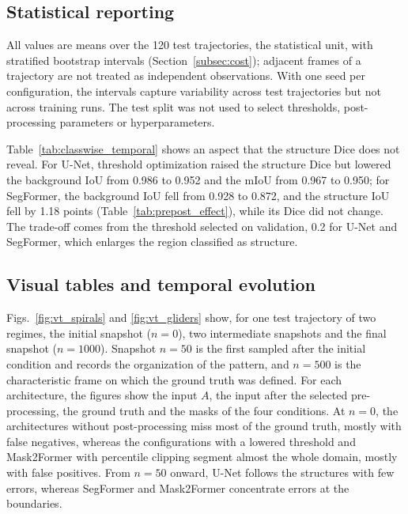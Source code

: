 \documentclass[final,5p,times,twocolumn]{elsarticle}
\begin{document}


\subsection{Statistical reporting}\label{subsec:statistics}

All values are means over the 120 test trajectories, the statistical unit, with stratified bootstrap intervals (Section~\ref{subsec:cost}); adjacent frames of a trajectory are not treated as independent observations. With one seed per configuration, the intervals capture variability across test trajectories but not across training runs. The test split was not used to select thresholds, post-processing parameters or hyperparameters.

Table~\ref{tab:classwise_temporal} shows an aspect that the structure Dice does not reveal. For U-Net, threshold optimization raised the structure Dice but lowered the background IoU from 0.986 to 0.952 and the mIoU from 0.967 to 0.950; for SegFormer, the background IoU fell from 0.928 to 0.872, and the structure IoU fell by 1.18 points (Table~\ref{tab:prepost_effect}), while its Dice did not change. The trade-off comes from the threshold selected on validation, 0.2 for U-Net and SegFormer, which enlarges the region classified as structure.



\subsection{Visual tables and temporal evolution}\label{subsec:visual}

Figs.~\ref{fig:vt_spirals} and \ref{fig:vt_gliders} show, for one test trajectory of two regimes, the initial snapshot ($n=0$), two intermediate snapshots and the final snapshot ($n=1000$). Snapshot $n=50$ is the first sampled after the initial condition and records the organization of the pattern, and $n=500$ is the characteristic frame on which the ground truth was defined. For each architecture, the figures show the input $A$, the input after the selected pre-processing, the ground truth and the masks of the four conditions. At $n=0$, the architectures without post-processing miss most of the ground truth, mostly with false negatives, whereas the configurations with a lowered threshold and Mask2Former with percentile clipping segment almost the whole domain, mostly with false positives. From $n=50$ onward, U-Net follows the structures with few errors, whereas SegFormer and Mask2Former concentrate errors at the boundaries.
\end{document}
